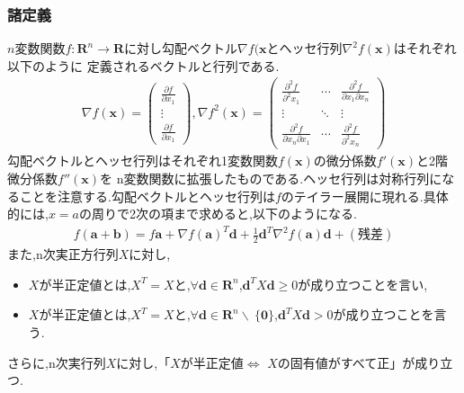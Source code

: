 \documentclass[12pt]{jarticle}
\begin{document}
\subsubsection{諸定義}
$n$変数関数$f:\boldsymbol{R}^n \rightarrow \boldsymbol{R}$に対し勾配ベクトル$\nabla f(\boldsymbol{x}$とヘッセ行列$\nabla^2f(\boldsymbol{x})$はそれぞれ以下のように
定義されるベクトルと行列である.
\begin{eqnarray}
    \nabla f(\boldsymbol{x})=\left(\begin{array}{r}
            \frac{\partial f}{\partial x_1} \\
            \vdots                          \\
            \frac{\partial f}{\partial x_1}
        \end{array}\right),
    \nabla f^2(\boldsymbol{x})=\left(\begin{array}{rrr}
            \frac{\partial^2f}{\partial^2x_1}            & \cdots & \frac{\partial^2f}{\partial x_1\partial x_n} \\
            \vdots                                       & \ddots & \vdots                                       \\
            \frac{\partial^2f}{\partial x_n\partial x_1} & \cdots & \frac{\partial^2f}{\partial^2x_n}
        \end{array}\right)\nonumber
\end{eqnarray}
勾配ベクトルとヘッセ行列はそれぞれ1変数関数$f(\boldsymbol{x})$の微分係数$f'(\boldsymbol{x})$と2階微分係数$f''(\boldsymbol{x})$を
n変数関数に拡張したものである.ヘッセ行列は対称行列になることを注意する.勾配ベクトルとヘッセ行列は$f$のテイラー展開に現れる.具体的には,$x=a$の周りで2次の項まで求めると,以下のようになる.
\begin{eqnarray}
    f(\boldsymbol{a}+\boldsymbol{b})=f{\boldsymbol{a}}+\nabla f(\boldsymbol{a})^T\boldsymbol{d}+\frac{1}{2}\boldsymbol{d}^T\nabla^2f(\boldsymbol{a})\boldsymbol{d}+(残差)\nonumber
\end{eqnarray}
また,n次実正方行列$X$に対し,
\begin{itemize}
    \item $X$が半正定値とは,$X^T=X$と,$\forall\boldsymbol{d}\in\boldsymbol{R}^n$,$\boldsymbol{d}^TX\boldsymbol{d}\geq 0$が成り立つことを言い,
    \item $X$が半正定値とは,$X^T=X$と,$\forall\boldsymbol{d}\in\boldsymbol{R}^n\backslash \ \{\boldsymbol{0}\}$,$\boldsymbol{d}^TX\boldsymbol{d}> 0$が成り立つことを言う.
\end{itemize}
さらに,n次実行列$X$に対し,「$X$が半正定値$\Leftrightarrow$ $X$の固有値がすべて正」が成り立つ.
\end{document}
